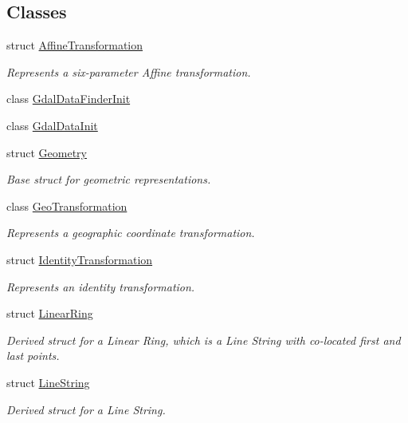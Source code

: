\subsection*{Classes}
\begin{DoxyCompactItemize}
\item 
struct \hyperlink{structdg_1_1deepcore_1_1geometry_1_1_affine_transformation}{Affine\+Transformation}
\begin{DoxyCompactList}\small\item\em Represents a six-\/parameter Affine transformation. \end{DoxyCompactList}\item 
class \hyperlink{classdg_1_1deepcore_1_1geometry_1_1_gdal_data_finder_init}{Gdal\+Data\+Finder\+Init}
\item 
class \hyperlink{classdg_1_1deepcore_1_1geometry_1_1_gdal_data_init}{Gdal\+Data\+Init}
\item 
struct \hyperlink{structdg_1_1deepcore_1_1geometry_1_1_geometry}{Geometry}
\begin{DoxyCompactList}\small\item\em Base struct for geometric representations. \end{DoxyCompactList}\item 
class \hyperlink{classdg_1_1deepcore_1_1geometry_1_1_geo_transformation}{Geo\+Transformation}
\begin{DoxyCompactList}\small\item\em Represents a geographic coordinate transformation. \end{DoxyCompactList}\item 
struct \hyperlink{structdg_1_1deepcore_1_1geometry_1_1_identity_transformation}{Identity\+Transformation}
\begin{DoxyCompactList}\small\item\em Represents an identity transformation. \end{DoxyCompactList}\item 
struct \hyperlink{structdg_1_1deepcore_1_1geometry_1_1_linear_ring}{Linear\+Ring}
\begin{DoxyCompactList}\small\item\em Derived struct for a Linear Ring, which is a Line String with co-\/located first and last points. \end{DoxyCompactList}\item 
struct \hyperlink{structdg_1_1deepcore_1_1geometry_1_1_line_string}{Line\+String}
\begin{DoxyCompactList}\small\item\em Derived struct for a Line String. \end{DoxyCompactList}\item 

\end{DoxyCompactItemize}
